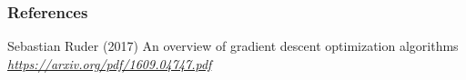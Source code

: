 

\begin{vbframe}
\frametitle{References}
\footnotesize{
\begin{thebibliography}{99}

 Sebastian Ruder (2017)
\newblock An overview of gradient descent optimization algorithms
\newblock \emph{\url{https://arxiv.org/pdf/1609.04747.pdf}}

\end{thebibliography}
}
\end{vbframe}

\endlecture

